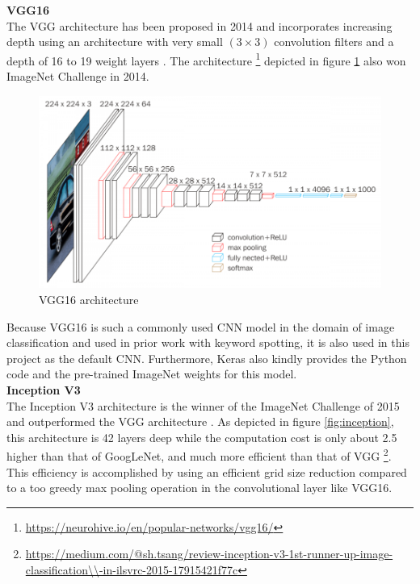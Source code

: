 \documentclass{article}
\theoremstyle{definition}
\theoremstyle{remark}
\begin{document}
\noindent\textbf{VGG16}\\

The VGG architecture has been proposed in 2014 and incorporates increasing depth using an architecture with very small $(3 \times 3)$ convolution filters and a depth of 16 to 19 weight layers \cite{simonyan2014very}. The architecture \footnote{\url{https://neurohive.io/en/popular-networks/vgg16/}} depicted in figure \ref{fig:vgg16_architecture} also won ImageNet Challenge in 2014.

\begin{figure}[h!]
    \centering
    \includegraphics[width=1\textwidth]{img/vgg16_architecture.png}
    \caption[VGG16 architecture]{VGG16 architecture}
    \label{fig:vgg16_architecture}
\end{figure}

Because VGG16 is such a commonly used CNN model in the domain of image classification and used in prior work with keyword spotting, it is also used in this project as the default CNN. Furthermore, Keras also kindly provides the Python code and the pre-trained ImageNet weights for this model.\\




\noindent\textbf{Inception V3}\\

The Inception V3 architecture is the winner of the ImageNet Challenge of 2015 and outperformed the VGG architecture \cite{szegedy2016rethinking}. As depicted in figure \ref{fig:inception}, this architecture is 42 layers deep while the computation cost is only about 2.5 higher than that of GoogLeNet, and much more efficient than that of VGG  \footnote{\url{https://medium.com/@sh.tsang/review-inception-v3-1st-runner-up-image-classification\\-in-ilsvrc-2015-17915421f77c}}. This efficiency is accomplished by using an efficient grid size reduction compared to a too greedy max pooling operation in the convolutional layer like VGG16.
\end{document}
